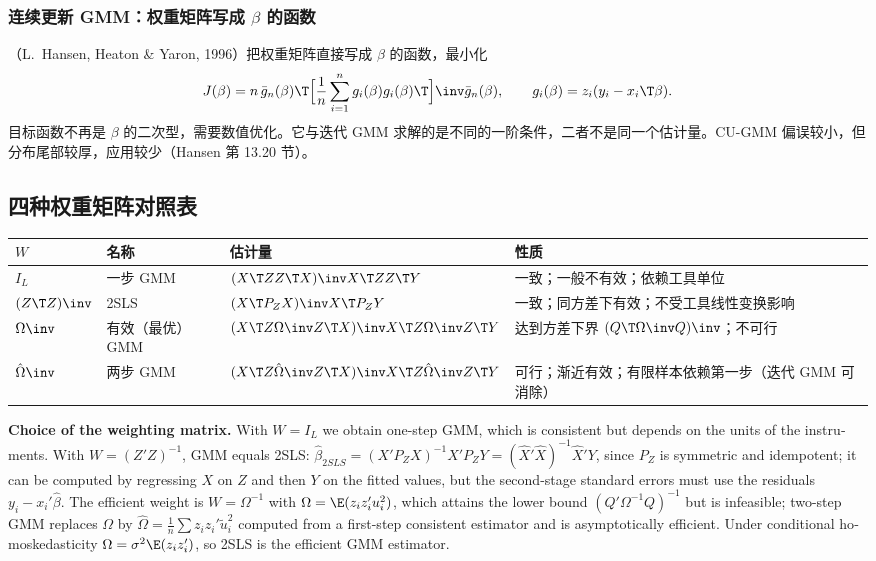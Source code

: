 \subsubsection{连续更新 GMM：权重矩阵写成 \texorpdfstring{$\beta$}{beta} 的函数}

（L.\ Hansen, Heaton \& Yaron, 1996）把权重矩阵直接写成 $\beta$ 的函数，最小化
\[
J(\beta)=n\,\bar g_n(\beta)\T\Big[\frac1n\sum_{i=1}^ng_i(\beta)g_i(\beta)\T\Big]\inv\bar g_n(\beta),\qquad g_i(\beta)=z_i(y_i-x_i\T\beta) .
\]
目标函数不再是 $\beta$ 的二次型，需要数值优化。它与迭代 GMM 求解的是不同的一阶条件，二者不是同一个估计量。CU-GMM 偏误较小，但分布尾部较厚，应用较少（Hansen 第 13.20 节）。

\subsection{四种权重矩阵对照表}\label{sec:U08b-Wtable}

\begin{center}
\small
\begin{tabularx}{\linewidth}{>{\raggedright\arraybackslash}p{1.3cm}>{\raggedright\arraybackslash}p{2.0cm}>{\raggedright\arraybackslash}p{4.4cm}L}
\toprule
$W$ & 名称 & 估计量 & 性质\\
\midrule
$I_L$ & 一步 GMM & $(X\T ZZ\T X)\inv X\T ZZ\T Y$ & 一致；一般不有效；依赖工具单位\\
$(Z\T Z)\inv$ & 2SLS & $(X\T P_ZX)\inv X\T P_ZY$ & 一致；同方差下有效；不受工具线性变换影响\\
$\Omega\inv$ & 有效（最优）GMM & $(X\T Z\Omega\inv Z\T X)\inv X\T Z\Omega\inv Z\T Y$ & 达到方差下界 $(Q\T\Omega\inv Q)\inv$；不可行\\
$\hat\Omega\inv$ & 两步 GMM & $(X\T Z\hat\Omega\inv Z\T X)\inv X\T Z\hat\Omega\inv Z\T Y$ & 可行；渐近有效；有限样本依赖第一步（迭代 GMM 可消除）\\
\bottomrule
\end{tabularx}
\end{center}

\begin{english}
\textbf{Choice of the weighting matrix.} With $W=I_L$ we obtain one-step GMM, which is consistent but depends on the units of the instruments. With $W=(Z'Z)^{-1}$, GMM equals 2SLS: $\hat\beta_{2SLS}=(X'P_ZX)^{-1}X'P_ZY=(\hat X'\hat X)^{-1}\hat X'Y$, since $P_Z$ is symmetric and idempotent; it can be computed by regressing $X$ on $Z$ and then $Y$ on the fitted values, but the second-stage standard errors must use the residuals $y_i-x_i'\hat\beta$. The efficient weight is $W=\Omega^{-1}$ with $\Omega=\E(z_iz_i'u_i^2)$, which attains the lower bound $(Q'\Omega^{-1}Q)^{-1}$ but is infeasible; two-step GMM replaces $\Omega$ by $\hat\Omega=\frac1n\sum z_iz_i'\tilde u_i^2$ computed from a first-step consistent estimator and is asymptotically efficient. Under conditional homoskedasticity $\Omega=\sigma^2\E(z_iz_i')$, so 2SLS is the efficient GMM estimator.
\end{english}

